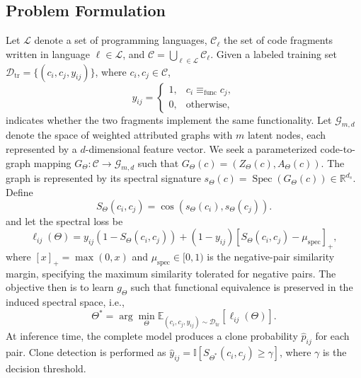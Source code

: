 \documentclass[final,5p,times,twocolumn]{elsarticle}
\theoremstyle{plain}
\begin{document}
\subsection{Problem Formulation}
\label{sec:revised_problem_formulation}

Let $\mathcal{L}$ denote a set of programming languages, $\mathcal{C}_{\ell}$ the set of code fragments written in language $\ell\in\mathcal{L}$, and $\mathcal{C}=\bigcup_{\ell\in\mathcal{L}}\mathcal{C}_{\ell}$. Given a labeled training set $\mathcal{D}_{\mathrm{tr}}=\{(c_i,c_j,y_{ij})\}$, where $c_i,c_j\in\mathcal{C}$,
\begin{equation}
y_{ij}=
\begin{cases}
1, & c_i\equiv_{\mathrm{func}}c_j,\\
0, & \text{otherwise},
\end{cases}
\label{eq:revised_clone_label}
\end{equation}
indicates whether the two fragments implement the same functionality. Let $\mathcal{G}_{m,d}$ denote the space of weighted attributed graphs with $m$ latent nodes, each represented by a $d$-dimensional feature vector. We seek a parameterized code-to-graph mapping $G_{\Theta}:\mathcal{C}\rightarrow\mathcal{G}_{m,d}$ such that $G_{\Theta}(c)=(Z_{\Theta}(c),A_{\Theta}(c))$. The graph is represented by its spectral signature $s_{\Theta}(c)=\operatorname{Spec}(G_{\Theta}(c))\in\mathbb{R}^{d_s}$. Define
\begin{equation}
S_{\Theta}(c_i,c_j)
=
\cos\!\left(s_{\Theta}(c_i),s_{\Theta}(c_j)\right).
\label{eq:spectral_similarity_old}
\end{equation}
and let the spectral loss be
\begin{equation}
\ell_{ij}(\Theta)
=
y_{ij}(1-S_{\Theta}(c_i,c_j))
+
(1-y_{ij})[S_{\Theta}(c_i,c_j)-\mu_{\mathrm{spec}}]_{+},
\label{eq:spectral_loss_old}
\end{equation}
where $[x]_{+}=\max(0,x)$ and $\mu_{\mathrm{spec}}\in[0,1)$ is the negative-pair similarity margin, specifying the maximum similarity tolerated for negative pairs. The objective then is to learn $g_{\Theta}$ such that functional equivalence is preserved in the induced spectral space, i.e.,
\begin{equation}
\Theta^{*}
=
\arg\min_{\Theta}
\mathbb{E}_{(c_i,c_j,y_{ij})\sim\mathcal{D}_{\mathrm{tr}}}
\left[\ell_{ij}(\Theta)\right].
\label{eq:latent_graph_objective_old}
\end{equation}
At inference time, the complete model produces a clone probability $\widehat{p}_{ij}$ for each pair. Clone detection is performed as $\widehat{y}_{ij}=\mathbb{I}[S_{\Theta^{*}}(c_i,c_j)\geq\gamma]$, where $\gamma$ is the decision threshold.
\end{document}
